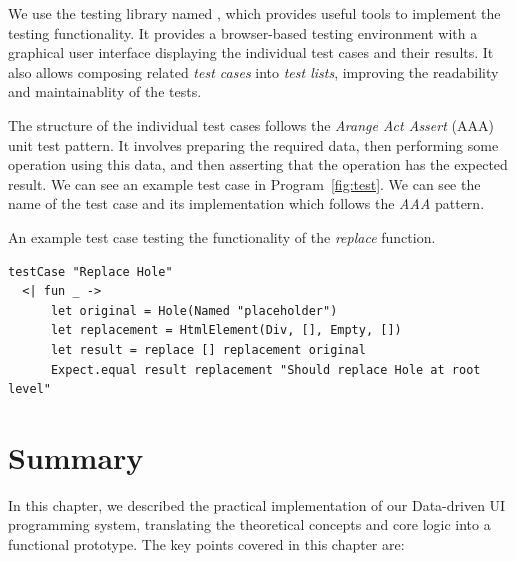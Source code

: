 We use the testing library named \citet{mocha}, which provides useful tools to implement the testing functionality.
It provides a browser-based testing environment with a graphical user interface displaying the individual test cases and their results.
It also allows composing related \emph{test cases} into \emph{test lists}, improving the readability and maintainablity of the tests.

The structure of the individual test cases follows the \emph{Arange Act Assert} (AAA) unit test pattern.
It involves preparing the required data, then performing some operation using this data, and then asserting that the operation has the expected result.
We can see an example test case in Program~\ref{fig:test}.
We can see the name of the test case and its implementation which follows the \emph{AAA} pattern.

\begin{listing}[htbp]
	\caption{An example test case testing the functionality of the \emph{replace} function.}
	\label{fig:test}
	\begin{lstlisting}
testCase "Replace Hole"
  <| fun _ ->
      let original = Hole(Named "placeholder")
      let replacement = HtmlElement(Div, [], Empty, [])
      let result = replace [] replacement original
      Expect.equal result replacement "Should replace Hole at root level"
  \end{lstlisting}
\end{listing}


\section{Summary}

In this chapter, we described the practical implementation of our Data-driven UI programming system,
translating the theoretical concepts and core logic into a functional prototype.
The key points covered in this chapter are:

